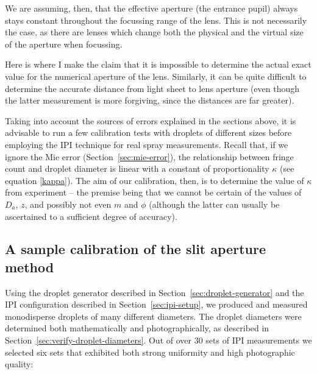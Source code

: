 \documentclass[11.5pt,oneside]{book}
\newcommand*{\secref}[1]{Section~\ref{#1}}
\begin{document}
We are assuming, then, that the effective aperture (the entrance pupil) always
stays constant throughout the focussing range of the lens. This is not
necessarily the case, as there are lenses which change both the physical and the
virtual size of the aperture when focussing.

Here is where I make the claim that it is impossible to determine the actual
exact value for the numerical aperture of the lens. Similarly, it can be quite
difficult to determine the accurate distance from light sheet to lens aperture
(even though the latter measurement is more forgiving, since the distances are
far greater).

Taking into account the sources of errors explained in the sections above, it is
advisable to run a few calibration tests with droplets of different sizes before
employing the IPI technique for real spray measurements. Recall that, if we
ignore the Mie error (\secref{sec:mie-error}), the relationship between fringe count and droplet diameter
is linear with a constant of proportionality $\kappa$ (see equation
\eqref{kappa}). The aim of our calibration, then, is to determine the value of
$\kappa$ from experiment -- the premise being that we cannot be certain of the
values of $D_a$, $z$, and possibly not even $m$ and $\phi$ (although the latter
can usually be ascertained to a sufficient degree of accuracy).

\subsection{A sample calibration of the slit aperture method}
Using the droplet generator described in \secref{sec:droplet-generator} and
the IPI configuration described in \secref{sec:ipi-setup}, we produced and
measured monodisperse droplets of many different diameters. The droplet
diameters were determined both mathematically and photographically, as described
in \secref{sec:verify-droplet-diameters}. Out of over 30 sets of IPI
measurements we selected six sets that exhibited both strong uniformity and
high photographic quality:
\end{document}
